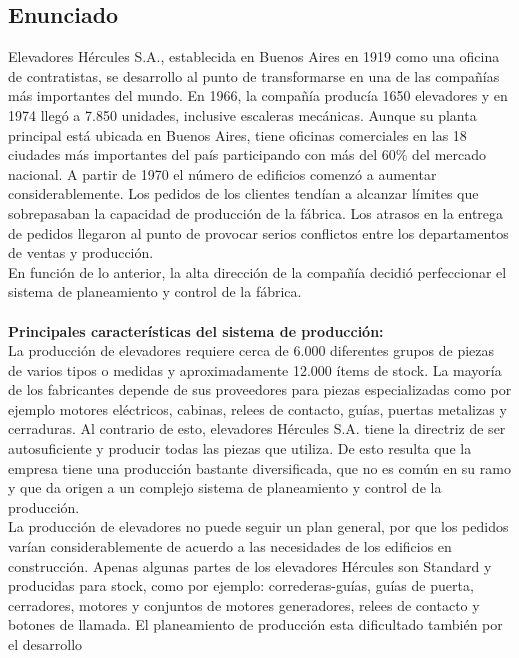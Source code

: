 \documentclass[a4paper,10pt,titlepage]{article}
\begin{document}
\subsection{Enunciado}

Elevadores H\'ercules S.A., establecida en Buenos Aires en 1919 como una oficina de
contratistas, se desarrollo al punto de transformarse en una de las compa\~n\'ias m\'as
importantes del mundo. En 1966, la compa\~n\'ia produc\'ia 1650 elevadores y en 1974
lleg\'o a 7.850 unidades, inclusive escaleras mec\'anicas. Aunque su planta principal est\'a
ubicada en Buenos Aires, tiene oficinas comerciales en las 18 ciudades m\'as
importantes del pa\'is participando con m\'as del 60\% del mercado nacional. A partir de
1970 el n\'umero de edificios comenz\'o a aumentar considerablemente. Los pedidos de
los clientes tend\'ian a alcanzar l\'imites que sobrepasaban la capacidad de producci\'on
de la f\'abrica. Los atrasos en la entrega de pedidos llegaron al punto de provocar serios
conflictos entre los departamentos de ventas y producci\'on.\\
En funci\'on de lo anterior, la alta direcci\'on de la compa\~n\'ia decidi\'o perfeccionar el
sistema de planeamiento y control de la f\'abrica.\\ \\
\textbf{Principales caracter\'isticas del sistema de producci\'on:}\\
La producci\'on de elevadores requiere cerca de 6.000 diferentes grupos de piezas de
varios tipos o medidas y aproximadamente 12.000 \'items de stock. La mayor\'ia de los
fabricantes depende de sus proveedores para piezas especializadas como por ejemplo
motores el\'ectricos, cabinas, relees de contacto, gu\'ias, puertas metalizas y cerraduras.
Al contrario de esto, elevadores H\'ercules S.A. tiene la directriz de ser autosuficiente y
producir todas las piezas que utiliza. De esto resulta que la empresa tiene una
producci\'on bastante diversificada, que no es com\'un en su ramo y que da origen a un
complejo sistema de planeamiento y control de la producci\'on.\\
La producci\'on de elevadores no puede seguir un plan general, por que los pedidos
var\'ian considerablemente de acuerdo a las necesidades de los edificios en
construcci\'on. Apenas algunas partes de los elevadores H\'ercules son Standard y
producidas para stock, como por ejemplo: correderas-gu\'ias, gu\'ias de puerta,
cerradores, motores y conjuntos de motores generadores, relees de contacto y botones
de llamada. El planeamiento de producci\'on esta dificultado tambi\'en por el desarrollo
\end{document}
